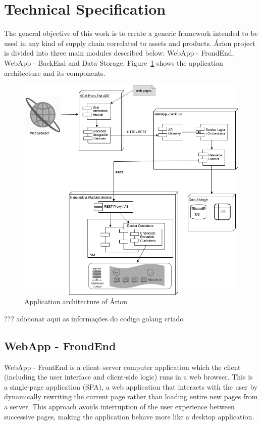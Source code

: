 \section{Technical Specification} \label{sec:Technical}

The general objective of this work is to create a generic framework intended to be used in any kind of supply chain correlated to assets and products. Árion project is divided into three main modules described below: WebApp - FrondEnd, WebApp - BackEnd and Data Storage. Figure~\ref{fig:detalhamentotecnico} shows the application architecture and its components.

\begin{figure}[htbp]
\begin{center}
  \includegraphics[scale=0.45]{images/detalhamentotecnico.png}
\caption{Application architecture of Árion}
\label{fig:detalhamentotecnico}
\end{center}
\end{figure}

{\color{red} ??? adicionar aqui as informações do codigo golang criado}

\subsection{WebApp - FrondEnd}\label{sec:WebAppFrondEnd}
WebApp - FrontEnd is a client–server computer application which the client (including the user interface and client-side logic) runs in a web browser. This is a single-page application (SPA), a web application that interacts with the user by dynamically rewriting the current page rather than loading entire new pages from a server. This approach avoids interruption of the user experience between successive pages, making the application behave more like a desktop application.

